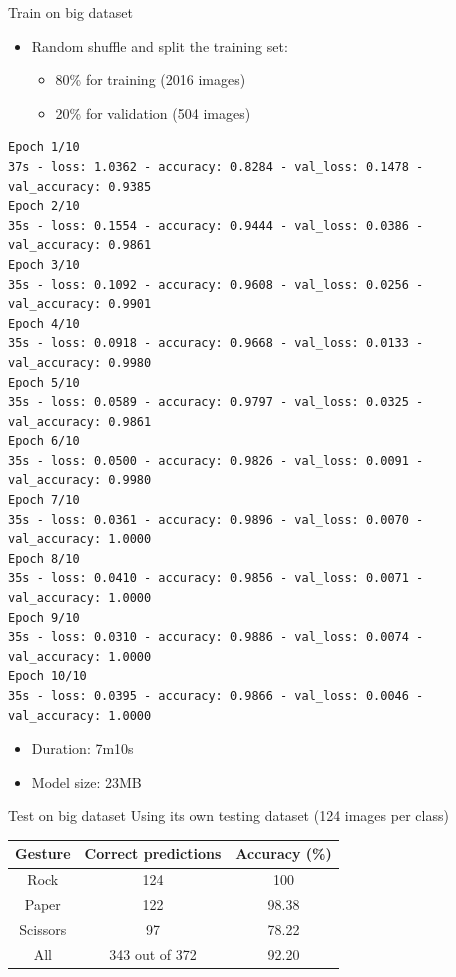 \begin{frame}[fragile]{Train on big dataset}
  \begin{itemize}
	\item Random shuffle and split the training set:
	\begin{itemize}
	  \item 80\% for training (2016 images)
	  \item 20\% for validation (504 images)
	\end{itemize}
  \end{itemize}
  \lstset{basicstyle=\tiny, numbers=left}
  \begin{lstlisting}
Epoch 1/10
37s - loss: 1.0362 - accuracy: 0.8284 - val_loss: 0.1478 - val_accuracy: 0.9385
Epoch 2/10
35s - loss: 0.1554 - accuracy: 0.9444 - val_loss: 0.0386 - val_accuracy: 0.9861
Epoch 3/10
35s - loss: 0.1092 - accuracy: 0.9608 - val_loss: 0.0256 - val_accuracy: 0.9901
Epoch 4/10
35s - loss: 0.0918 - accuracy: 0.9668 - val_loss: 0.0133 - val_accuracy: 0.9980
Epoch 5/10
35s - loss: 0.0589 - accuracy: 0.9797 - val_loss: 0.0325 - val_accuracy: 0.9861
Epoch 6/10
35s - loss: 0.0500 - accuracy: 0.9826 - val_loss: 0.0091 - val_accuracy: 0.9980
Epoch 7/10
35s - loss: 0.0361 - accuracy: 0.9896 - val_loss: 0.0070 - val_accuracy: 1.0000
Epoch 8/10
35s - loss: 0.0410 - accuracy: 0.9856 - val_loss: 0.0071 - val_accuracy: 1.0000
Epoch 9/10
35s - loss: 0.0310 - accuracy: 0.9886 - val_loss: 0.0074 - val_accuracy: 1.0000
Epoch 10/10
35s - loss: 0.0395 - accuracy: 0.9866 - val_loss: 0.0046 - val_accuracy: 1.0000
  \end{lstlisting}
  \begin{itemize}
	\item Duration: 7m10s
	\item Model size: 23MB
  \end{itemize}
\end{frame}

\begin{frame}{Test on big dataset}
Using its own testing dataset (124 images per class)
  \begin{table}
	\begin{tabular}{|c|c|c|}
	  \hline
		\textbf{Gesture} & \textbf{Correct predictions} & \textbf{Accuracy (\%)} \\
	  \hline
		Rock & 124 & 100 \\
	  \hline
		Paper & 122 & 98.38 \\
	  \hline
		Scissors & 97 & 78.22 \\
	  \hline
	  \hline
		All & 343 out of 372 & 92.20 \\
	  \hline
	\end{tabular}
  \end{table}
\end{frame}

